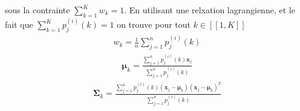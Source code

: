 \documentclass[letterpaper,10pt,english]{jupyterBook}
\begin{document}
\sphinxAtStartPar
sous la contrainte \(\displaystyle\sum_{k=1}^K w_k=1\). En utilisant une relxation lagrangienne, et le fait que \(\displaystyle\sum_{k=1}^K p_j^{(i)}(k)=1\) on trouve pour tout \(k\in[\![1,K]\!]\)
\begin{equation*}
\begin{split}w_k = \frac1n\displaystyle\sum_{j=1}^n p_j^{(i)}(k)\end{split}
\end{equation*}\begin{equation*}
\begin{split}\boldsymbol\mu_k = \frac{\displaystyle\sum_{j=1}^n p_j^{(i)}(k) \mathbf x_j}{\displaystyle\sum_{j=1}^n p_j^{(i)}(k)}\end{split}
\end{equation*}\begin{equation*}
\begin{split}\boldsymbol\Sigma_{k} = \frac{\displaystyle\sum_{j=1}^n p_j^{(i)}(k) (\mathbf x_j-\boldsymbol\mu_k)(\mathbf x_j-\boldsymbol\mu_k)^T}{\displaystyle\sum_{j=1}^n p_j^{(i)}(k)}\end{split}
\end{equation*}
\end{document}
